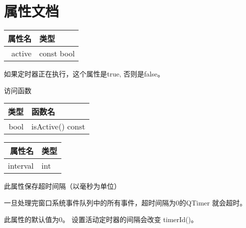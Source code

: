 \section{属性文档}

\begin{tabular}{|r|l|}
	\hline
	属性名&	类型 \\ 
	\hline
active&	const bool \\ 
	\hline 
\end{tabular}

如果定时器正在执行，这个属性是true, 否则是false。

访问函数

\begin{tabular}{|r|l|}
	\hline
类型 &	函数名 \\ 
\hline
bool	& isActive() const \\ 
	\hline 
\end{tabular}



\begin{tabular}{|r|l|}
	\hline
属性名	 & 类型 \\
\hline
interval & 	int \\
	\hline 
\end{tabular}

此属性保存超时间隔（以毫秒为单位）

一旦处理完窗口系统事件队列中的所有事件，超时间隔为0的QTimer 就会超时。

此属性的默认值为0。 设置活动定时器的间隔会改变 timerId()。







